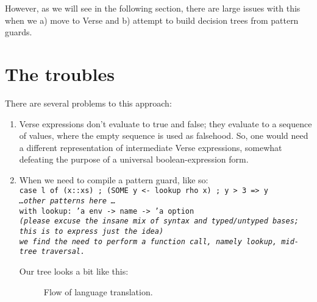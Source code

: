 \documentclass{article}
\begin{document}
    However, as we will see in the following section, there are large issues
    with this when we a) move to Verse and b) attempt to build decision trees
    from pattern guards. 

\section{The troubles}

There are several problems to this approach: 

\begin{enumerate}
    \item Verse expressions don't evaluate to true and false; they evaluate to a
          sequence of values, where the empty sequence \fail\; is used as
          falsehood. So, one would need a different representation of
          intermediate Verse expressions, somewhat defeating the purpose 
          of a universal boolean-expression form. 
    \item When we need to compile a pattern guard, like so: \\
        \tt{case l of (x::xs) ; (SOME y <- lookup rho x) ; y > 3 => y \\
            \it{\dots other patterns here \dots}} \\
        with \tt{lookup: 'a env -> name -> 'a option} \\
        \it{(please excuse the insane mix of syntax and typed/untyped bases; 
        this is to express just the idea)} \\
        we find the need to perform a function call, namely 
        \tt{lookup}, mid-tree traversal. 

        Our tree looks a bit like this: 


\bigskip
\begin{figure}[H]
    \centering
    \caption{Flow of language translation.}
    \label{fig:graph}
\end{figure}
\end{enumerate}
\end{document}
